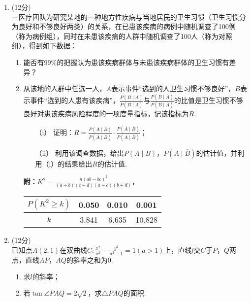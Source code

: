 \documentclass[11pt,space]{ctexart} %
\begin{document}
\begin{enumerate}[itemsep=0.5em,topsep=5pt,resume]
\item (12分)\\
一医疗团队为研究某地的一种地方性疾病与当地居民的卫生习惯（卫生习惯分为良好和不够良好两类）的关系，在已患该疾病的病例中随机调查了100例（称为病例组），同时在未患该疾病的人群中随机调查了100人（称为对照组），得到如下数据：
\begin{table}[H]
	\centering
\end{table}
\begin{enumerate}[itemsep=-0.3em,label={（\arabic*）},topsep=0pt,labelsep=.5em,leftmargin=3em]
	\item 能否有99\%的把握认为患该疾病群体与未患该疾病群体的卫生习惯有差异？
 	\item 从该地的人群中任选一人，$A$表示事件“选到的人卫生习惯不够良好”，$B$表示事件“选到的人患有该疾病”，$\frac{P(B\mid A)}{P(\overline{B}\mid A)}$与$\frac{P(B\mid \overline{A})}{P(\overline{B}\mid \overline{A})}$的比值是卫生习惯不够良好对患该疾病风险程度的一项度量指标，记该指标为$R$.
 	\begin{itemize}
	    \item[（$\mathrm{i}$）] 证明：$R=\frac{P(A\mid B)}{P(\overline{A}\mid B)}\cdot\frac{P(\overline{A}\mid \overline{B})}{P(A\mid \overline{B})}$；
	    \item[（$\mathrm{ii}$）] 利用该调查数据，给出$P(A\mid B)$，$P(A\mid \overline{B})$的估计值，并利用（i）的结果给出$R$的估计值.
	\end{itemize}
	\textbf{附：}$K^2 = \frac{n(ab-bc)^2}{(a+b)(c+d)(a+c)(b+d)}$，
	\begin{tabular}{c|ccc}
		$P\left(K^2\geq k\right)$ & 0.050 & 0.010 & 0.001 \\ \hline
		$k$  & 3.841  & 6.635 & 10.828 \\ 
	\end{tabular}
\end{enumerate}

\item (12分) \\
已知点$A(2,1)$在双曲线$C:\frac{x^2}{a^2}-\frac{y^2}{a^2-1}=1(a>1)$上，直线$l$交$C$于$P$，$Q$两点，直线$AP$，$AQ$的斜率之和为0.
\begin{enumerate}[itemsep=-0.3em,label={（\arabic*）},topsep=0pt,labelsep=.5em,leftmargin=3em]
	\item 求$l$的斜率；
	\item 若$\tan\angle PAQ=2\sqrt{2}$，求$\triangle PAQ$的面积.
\end{enumerate}


\end{enumerate}
\end{document}
